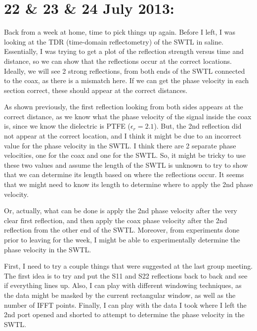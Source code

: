 \documentclass[12pt,onecolumn,titlepage]{article}
\begin{document}
\clearpage
\section{22 \& 23 \& 24 July 2013:}

\indent \indent Back from a week at home, time to pick things up again. Before I left, I was looking at the TDR (time-domain reflectometry) of the SWTL in saline. Essentially, I was trying to get a plot of the reflection strength versus time and distance, so we can show that the reflections occur at the correct locations. Ideally, we will see 2 strong reflections, from both ends of the SWTL connected to the coax, as there is a mismatch here. If we can get the phase velocity in each section correct, these should appear at the correct distances. 

As shown previously, the first reflection looking from both sides appears at the correct distance, as we know what the phase velocity of the signal inside the coax is, since we know the dielectric is PTFE ($\epsilon_r = 2.1$). But, the 2nd reflection did not appear at the correct location, and I think it might be due to an incorrect value for the phase velocity in the SWTL. I think there are 2 separate phase velocities, one for the coax and one for the SWTL. So, it might be tricky to use these two values and assume the length of the SWTL is unknown to try to show that we can determine its length based on where the reflections occur. It seems that we might need to know its length to determine where to apply the 2nd phase velocity.

Or, actually, what can be done is apply the 2nd phase velocity after the very clear first reflection, and then apply the coax phase velocity after the 2nd reflection from the other end of the SWTL. Moreover, from experiments done prior to leaving for the week, I might be able to experimentally determine the phase velocity in the SWTL.

First, I need to try a couple things that were suggested at the last group meeting. The first idea is to try and put the S11 and S22 reflections back to back and see if everything lines up. Also, I can play with different windowing techniques, as the data might be masked by the current rectangular window, as well as the number of IFFT points. Finally, I can play with the data I took where I left the 2nd port opened and shorted to attempt to determine the phase velocity in the SWTL.
\end{document}
